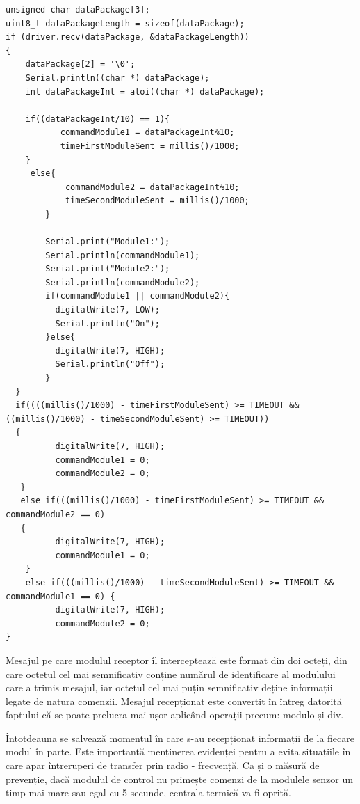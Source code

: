 \vspace{1em}
	
\begin{lstlisting}
unsigned char dataPackage[3];
uint8_t dataPackageLength = sizeof(dataPackage);
if (driver.recv(dataPackage, &dataPackageLength))
{
    dataPackage[2] = '\0';
    Serial.println((char *) dataPackage);
    int dataPackageInt = atoi((char *) dataPackage);

    if((dataPackageInt/10) == 1){
           commandModule1 = dataPackageInt%10;
           timeFirstModuleSent = millis()/1000;
    }
     else{
            commandModule2 = dataPackageInt%10;
            timeSecondModuleSent = millis()/1000;
        }
        
        Serial.print("Module1:");
        Serial.println(commandModule1);
        Serial.print("Module2:");
        Serial.println(commandModule2);
        if(commandModule1 || commandModule2){
          digitalWrite(7, LOW);
          Serial.println("On");
        }else{
          digitalWrite(7, HIGH);
          Serial.println("Off");
        }
  }
  if((((millis()/1000) - timeFirstModuleSent) >= TIMEOUT && ((millis()/1000) - timeSecondModuleSent) >= TIMEOUT))
  {
          digitalWrite(7, HIGH);
          commandModule1 = 0;
          commandModule2 = 0;
   }
   else if(((millis()/1000) - timeFirstModuleSent) >= TIMEOUT && commandModule2 == 0)
   {
          digitalWrite(7, HIGH);
          commandModule1 = 0;
    }
    else if(((millis()/1000) - timeSecondModuleSent) >= TIMEOUT && commandModule1 == 0) {
          digitalWrite(7, HIGH);
          commandModule2 = 0;
}
\end{lstlisting}
\vspace{2em} 

	Mesajul pe care modulul receptor îl interceptează este format din doi octeți, din care octetul cel mai semnificativ conține numărul de identificare al modulului care a trimis mesajul, iar octetul cel mai puțin semnificativ deține informații legate de natura comenzii. Mesajul recepționat este convertit în întreg datorită faptului că se poate prelucra mai ușor aplicând operații precum: modulo și div.

	Întotdeauna se salvează momentul în care s-au recepționat informații de la fiecare modul în parte. Este importantă menținerea evidenței pentru a evita situațiile în care apar întreruperi de transfer prin radio - frecvență. Ca și o măsură de prevenție, dacă modulul de control nu primește comenzi de la modulele senzor un timp mai mare sau egal cu 5 secunde, centrala termică va fi oprită.

